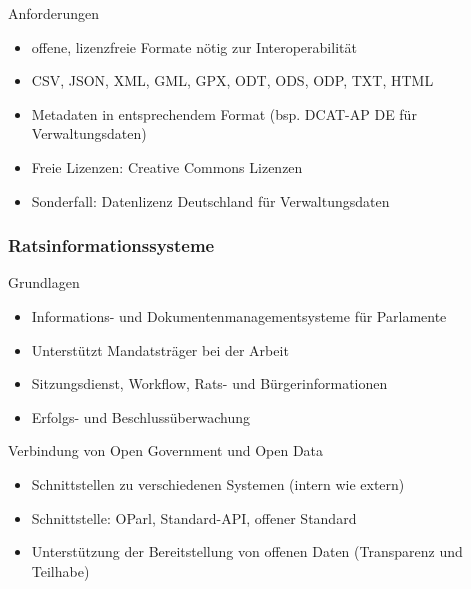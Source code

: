 Anforderungen

\begin{itemize}
  \item offene, lizenzfreie Formate nötig zur Interoperabilität
  \item CSV, JSON, XML, GML, GPX, ODT, ODS, ODP, TXT, HTML
  \item Metadaten in entsprechendem Format (bsp. DCAT-AP DE für Verwaltungsdaten)
  \item Freie Lizenzen: Creative Commons Lizenzen
  \item Sonderfall: Datenlizenz Deutschland für Verwaltungsdaten
\end{itemize}

\subsubsection{Ratsinformationssysteme}
Grundlagen

\begin{itemize}
  \item Informations- und Dokumentenmanagementsysteme für Parlamente
  \item Unterstützt Mandatsträger bei der Arbeit
  \item Sitzungsdienst, Workflow, Rats- und Bürgerinformationen
  \item Erfolgs- und Beschlussüberwachung
\end{itemize}

Verbindung von Open Government und Open Data

\begin{itemize}
  \item Schnittstellen zu verschiedenen Systemen (intern wie extern)
  \item Schnittstelle: OParl, Standard-API, offener Standard
  \item Unterstützung der Bereitstellung von offenen Daten (Transparenz und Teilhabe)
\end{itemize}